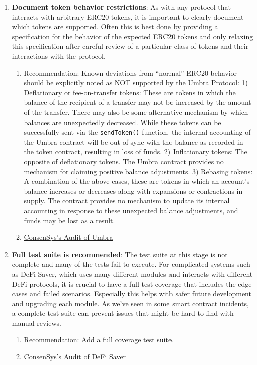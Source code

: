 \begin{enumerate}
\item\textbf{Document token behavior restrictions}: As with any protocol that interacts with arbitrary ERC20 tokens, it is important to clearly document which tokens are supported. Often this is best done by providing a specification for the behavior of the expected ERC20 tokens and only relaxing this specification after careful review of a particular class of tokens and their interactions with the protocol.
	\begin{enumerate}
	\item Recommendation: Known deviations from “normal” ERC20 behavior should be explicitly noted as NOT supported by the Umbra Protocol: 1) Deflationary or fee-on-transfer tokens: These are tokens in which the balance of the recipient of a transfer may not be increased by the amount of the transfer. There may also be some alternative mechanism by which balances are unexpectedly decreased. While these tokens can be successfully sent via the \verb|sendToken()| function, the internal accounting of the Umbra contract will be out of sync with the balance as recorded in the token contract, resulting in loss of funds. 2) Inflationary tokens: The opposite of deflationary tokens. The Umbra contract provides no mechanism for claiming positive balance adjustments. 3) Rebasing tokens: A combination of the above cases, these are tokens in which an account’s balance increases or decreases along with expansions or contractions in supply. The contract provides no mechanism to update its internal accounting in response to these unexpected balance adjustments, and funds may be lost as a result.
	\item\href{https://consensys.net/diligence/audits/2021/03/umbra-smart-contracts/\#document-token-behavior-restrictions}{ConsenSys's Audit of Umbra}
	\end{enumerate}

\item\textbf{Full test suite is recommended}: The test suite at this stage is not complete and many of the tests fail to execute. For complicated systems such as DeFi Saver, which uses many different modules and interacts with different DeFi protocols, it is crucial to have a full test coverage that includes the edge cases and failed scenarios. Especially this helps with safer future development and upgrading each module. As we’ve seen in some smart contract incidents, a complete test suite can prevent issues that might be hard to find with manual reviews.
	\begin{enumerate}
	\item Recommendation: Add a full coverage test suite.
	\item\href{https://consensys.net/diligence/audits/2021/03/defi-saver/\#full-test-suite-is-recommended}{ConsenSys's Audit of DeFi Saver}
	\end{enumerate}


\end{enumerate}
